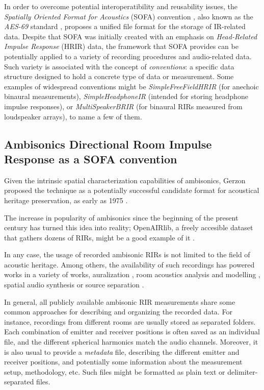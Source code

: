 In order to overcome potential interoperatibility and reusability issues, the \textit{Spatially Oriented Format for Acoustics} (SOFA) convention \cite{majdak2013spatially}, also known as the \textit{AES-69} standard \cite{majdak2015aes69}, proposes a unified file format for the storage of IR-related data. 
Despite that SOFA was initially created with an emphasis on \textit{Head-Related Impulse Response} (HRIR) data, the framework that SOFA provides can be potentially applied to a variety of recording procedures and audio-related data. 
Such variety is associated with the concept of \textit{conventions}: a specific data structure designed to hold a concrete type of data or measurement. Some examples of widespread conventions might be \textit{SimpleFreeFieldHRIR} (for anechoic binaural measurements), \textit{SimpleHeadphoneIR} (intended for storing headphone impulse responses), or \textit{MultiSpeakerBRIR} (for binaural RIRs measured from loudspeaker arrays), to name a few of them.


\subsection{Ambisonics Directional Room Impulse Response as a SOFA convention}
\label{subsec:adrir}

Given the intrinsic spatial characterization capabilities of ambisonics, Gerzon proposed the technique as a potentially successful candidate format for acoustical heritage preservation, as early as 1975 \cite{gerzon1975recording}.

The increase in popularity of ambisonics since the beginning of the present century has turned this idea into reality; OpenAIRlib, a freely accesible dataset that gathers dozens of RIRs, might be a good example of it \cite{murphy2010openair, openair}.

In any case, the usage of recorded ambisonic RIRs is not limited to the field of acoustic heritage. Among others, the availability of such recordings has powered works in a variety of works, auralization \cite{postma2016virtual}, room acoustics analysis \cite{embrechts2015measurement,clapp2011investigations} and modelling \cite{romblom2017diffuse}, spatial audio synthesis \cite{coleman2017object} or source separation \cite{baque2016separation}. 


In general, all publicly available ambisonic RIR measurements share some common approaches for describing and organizing the recorded data. 
For instance, recordings from different rooms are usually stored as separated folders. 
Each combination of emitter and receiver positions is often saved as an individual file, and the different spherical harmonics match the audio channels.
Moreover, it is also usual to provide a \textit{metadata} file, describing the different emitter and receiver positions, and potentially some information about the measurement setup, methodology, etc. Such files might be formatted as plain text or delimiter-separated files.
 
